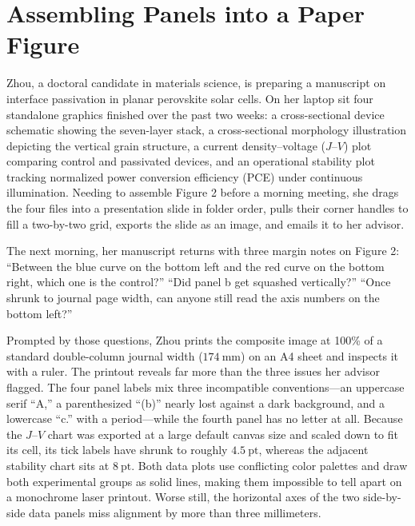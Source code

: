 \chapter{Assembling Panels into a Paper Figure}
\usetikzlibrary{patterns}
\providecommand{\ding}[1]{$\times$}
\providecommand{\sout}[1]{\leavevmode\begingroup\sbox0{#1}\hbox{\copy0\kern-\wd0\rule[0.5ex]{\wd0}{0.4pt}}\endgroup}

Zhou, a doctoral candidate in materials science, is preparing a manuscript on interface passivation in planar perovskite solar cells. On her laptop sit four standalone graphics finished over the past two weeks: a cross-sectional device schematic showing the seven-layer stack, a cross-sectional morphology illustration depicting the vertical grain structure, a current density--voltage ($J\text{--}V$) plot comparing control and passivated devices, and an operational stability plot tracking normalized power conversion efficiency (PCE) under continuous illumination. Needing to assemble Figure 2 before a morning meeting, she drags the four files into a presentation slide in folder order, pulls their corner handles to fill a two-by-two grid, exports the slide as an image, and emails it to her advisor.

The next morning, her manuscript returns with three margin notes on Figure 2: ``Between the blue curve on the bottom left and the red curve on the bottom right, which one is the control?'' ``Did panel b get squashed vertically?'' ``Once shrunk to journal page width, can anyone still read the axis numbers on the bottom left?''

Prompted by those questions, Zhou prints the composite image at 100\% of a standard double-column journal width ($174\ \text{mm}$) on an A4 sheet and inspects it with a ruler. The printout reveals far more than the three issues her advisor flagged. The four panel labels mix three incompatible conventions---an uppercase serif ``A,'' a parenthesized ``(b)'' nearly lost against a dark background, and a lowercase ``c.'' with a period---while the fourth panel has no letter at all. Because the $J\text{--}V$ chart was exported at a large default canvas size and scaled down to fit its cell, its tick labels have shrunk to roughly $4.5\ \text{pt}$, whereas the adjacent stability chart sits at $8\ \text{pt}$. Both data plots use conflicting color palettes and draw both experimental groups as solid lines, making them impossible to tell apart on a monochrome laser printout. Worse still, the horizontal axes of the two side-by-side data panels miss alignment by more than three millimeters.

